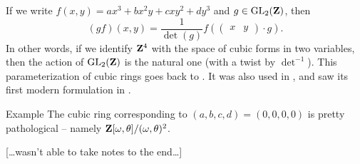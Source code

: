 If we write $f(x,y) = a x^3 + b x^2 y + c xy^2 + d y^3$ and 
$g\in \operatorname{GL}_2(\mathbf{Z})$, then 
\[
  (g f)(x,y) = \frac{1}{\det(g)} f\left(\begin{pmatrix} x & y \end{pmatrix} \cdot g\right) .
\]
In other words, if we identify $\mathbf{Z}^4$ with the space of cubic forms in 
two variables, then the action of $\operatorname{GL}_2(\mathbf{Z})$ is the natural one 
(with a twist by $\det^{-1}$). 
This parameterization of cubic rings goes back to \cite{df64}. It was also 
used in \cite{dh69}, and saw its first modern formulation in 
\cite{ggs02}. 

\begin{enonce}[remark]{Example}
The cubic ring corresponding to $(a,b,c,d)=(0,0,0,0)$ is pretty pathological -- 
namely $\mathbf{Z}[\omega,\theta]/(\omega,\theta)^2$. 
\end{enonce}

[\ldots wasn't able to take notes to the end\ldots]




